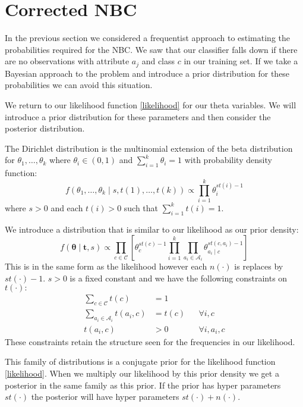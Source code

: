 \section{Corrected NBC}

In the previous section we considered a frequentist approach to estimating the probabilities required for the NBC.
We saw that our classifier falls down if there are no observations with attribute $a_j$ and class $c$ in our training set.
If we take a Bayesian approach to the problem and introduce a prior distribution for these probabilities we can avoid this situation.


We return to our likelihood function \cref{likelihood} for our theta variables.
We will introduce a prior distribution for these parameters and then consider the posterior distribution.

The Dirichlet distribution is the multinomial extension of the beta distribution for $\theta_1,\dots,\theta_k$ where $\theta_i \in (0,1)$ and $\sum_{i=1}^k \theta_i = 1$ with probability density function:
\begin{equation} \label{dirichlet_pdf}
	f(\theta_1,\dots,\theta_k \mid s, t(1),\dots,t(k)) \propto \prod_{i=1}^k \theta_i^{st(i) - 1}
\end{equation}
where $s > 0$ and each $t(i)>0$ such that $\sum_{i=1}^{k}t(i) = 1$.

We introduce a distribution that is similar to our likelihood as our prior density:
\begin{equation} \label{prior}
	f(\mathbf{\theta} \mid \mathbf{t}, s) \propto \prod_{c \in \mathcal{C}} \left[ \theta_c^{st(c) - 1} \prod_{i=1}^k \prod_{a_i \in \mathcal{A}_i} \theta_{a_i \mid c}^{st(c, a_i) - 1} \right]
\end{equation}
This is in the same form as the likelihood however each $n(\cdot)$ is replaces by $st(\cdot) - 1$.
$s > 0$ is a fixed constant and we have the following constraints on $t(\cdot):$
\begin{align}\label{prior_constraints}
	\sum_{c \in \mathcal{C}} t(c) & = 1 \\
	\sum_{a_i \in \mathcal{A}_i} t(a_i, c) & = t(c) && \forall i, c \\
	t(a_i, c) & > 0 && \forall i, a_i, c
\end{align}
These constraints retain the structure seen for the frequencies in our likelihood.

This family of distributions is a conjugate prior for the likelihood function \cref{likelihood}.
When we multiply our likelihood by this prior density we get a posterior in the same family as this prior.
If the prior has hyper parameters $st(\cdot)$ the posterior will have hyper parameters $st(\cdot) + n(\cdot)$.

